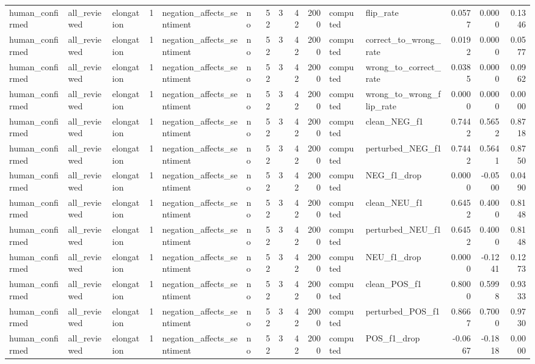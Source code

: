 \begin{tabular}{lllrllrrrrllrrr}
human_confirmed & all_reviewed & elongation & 1 & negation_affects_sentiment & no & 52 & 3 & 42 & 2000 & computed & flip_rate & 0.0577 & 0.0000 & 0.1346 \\
human_confirmed & all_reviewed & elongation & 1 & negation_affects_sentiment & no & 52 & 3 & 42 & 2000 & computed & correct_to_wrong_rate & 0.0192 & 0.0000 & 0.0577 \\
human_confirmed & all_reviewed & elongation & 1 & negation_affects_sentiment & no & 52 & 3 & 42 & 2000 & computed & wrong_to_correct_rate & 0.0385 & 0.0000 & 0.0962 \\
human_confirmed & all_reviewed & elongation & 1 & negation_affects_sentiment & no & 52 & 3 & 42 & 2000 & computed & wrong_to_wrong_flip_rate & 0.0000 & 0.0000 & 0.0000 \\
human_confirmed & all_reviewed & elongation & 1 & negation_affects_sentiment & no & 52 & 3 & 42 & 2000 & computed & clean_NEG_f1 & 0.7442 & 0.5652 & 0.8718 \\
human_confirmed & all_reviewed & elongation & 1 & negation_affects_sentiment & no & 52 & 3 & 42 & 2000 & computed & perturbed_NEG_f1 & 0.7442 & 0.5641 & 0.8750 \\
human_confirmed & all_reviewed & elongation & 1 & negation_affects_sentiment & no & 52 & 3 & 42 & 2000 & computed & NEG_f1_drop & 0.0000 & -0.0500 & 0.0490 \\
human_confirmed & all_reviewed & elongation & 1 & negation_affects_sentiment & no & 52 & 3 & 42 & 2000 & computed & clean_NEU_f1 & 0.6452 & 0.4000 & 0.8148 \\
human_confirmed & all_reviewed & elongation & 1 & negation_affects_sentiment & no & 52 & 3 & 42 & 2000 & computed & perturbed_NEU_f1 & 0.6452 & 0.4000 & 0.8148 \\
human_confirmed & all_reviewed & elongation & 1 & negation_affects_sentiment & no & 52 & 3 & 42 & 2000 & computed & NEU_f1_drop & 0.0000 & -0.1241 & 0.1273 \\
human_confirmed & all_reviewed & elongation & 1 & negation_affects_sentiment & no & 52 & 3 & 42 & 2000 & computed & clean_POS_f1 & 0.8000 & 0.5998 & 0.9333 \\
human_confirmed & all_reviewed & elongation & 1 & negation_affects_sentiment & no & 52 & 3 & 42 & 2000 & computed & perturbed_POS_f1 & 0.8667 & 0.7000 & 0.9730 \\
human_confirmed & all_reviewed & elongation & 1 & negation_affects_sentiment & no & 52 & 3 & 42 & 2000 & computed & POS_f1_drop & -0.0667 & -0.1818 & 0.0000 \\

\end{tabular}
